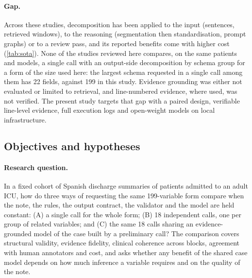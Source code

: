 \paragraph{Gap.} Across these studies, decomposition has been applied to the input (sentences, retrieved
windows), to the reasoning (segmentation then standardisation, prompt graphs) or to a review pass, and its
reported benefits come with higher cost (\cref{tab:sota}). None of the studies reviewed here compares, on the
same patients and models, a single call with an output-side decomposition by schema group for a form of the
size used here: the largest schema requested in a single call among them has 22 fields, against 199 in this
study. Evidence grounding was either not evaluated or limited to retrieval, and line-numbered evidence, where
used, was not verified. The present study targets that gap with a paired design, verifiable line-level
evidence, full execution logs and open-weight models on local infrastructure.

\subsection{Objectives and hypotheses}\label{sec:objectives}

\paragraph{Research question.} In a fixed cohort of Spanish discharge summaries of patients admitted to an
adult ICU, how do three ways of requesting the same 199-variable form compare when the note, the rules, the
output contract, the validator and the model are held constant: (A) a single call for the whole form;
(B) 18 independent calls, one per group of related variables; and (C) the same 18 calls sharing an
evidence-grounded model of the case built by a preliminary call? The comparison covers structural validity,
evidence fidelity, clinical coherence across blocks, agreement with human annotators and cost, and asks
whether any benefit of the shared case model depends on how much inference a variable requires and on the
quality of the note.

